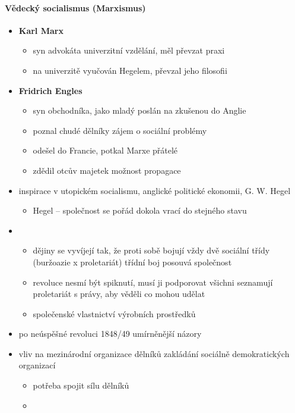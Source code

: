 \paragraph{Vědecký socialismus (Marxismus)}
\begin{itemize}
\item \textbf{Karl Marx}
	\begin{itemize}
	\item syn advokáta \ra univerzitní vzdělání, měl převzat praxi
	\item na univerzitě vyučován Hegelem, převzal jeho filosofii
	\end{itemize}
\item \textbf{Fridrich Engles}
	\begin{itemize}
	\item syn obchodníka, jako mladý poslán na zkušenou do Anglie
	\item poznal chudé dělníky \ra zájem o sociální problémy
	\item odešel do Francie, potkal Marxe \ra přátelé
	\item zdědil otcův majetek \ra možnost propagace
	\end{itemize}
\item inspirace v utopickém socialismu, anglické politické ekonomii, G. W. Hegel
	\begin{itemize}
	\item Hegel -- společnost se pořád dokola vrací do stejného stavu
	\end{itemize}
\item {}
	\begin{itemize}
	\item dějiny se vyvíjejí tak, že proti sobě bojují vždy dvě sociální třídy (buržoazie x proletariát) \ra třídní boj posouvá společnost
	\item revoluce nesmí být spiknutí, musí ji podporovat všichni \ra seznamují proletariát s právy, aby věděli co mohou udělat
	\item společenské vlastnictví výrobních prostředků
	\end{itemize}
\item po neúspěšné revoluci 1848/49 umírněnější názory
\item vliv na mezinárodní organizace dělníků \ra zakládání sociálně demokratických organizací
	\begin{itemize}
	\item potřeba spojit sílu dělníků
	\item {}

\end{itemize}
\end{itemize}
